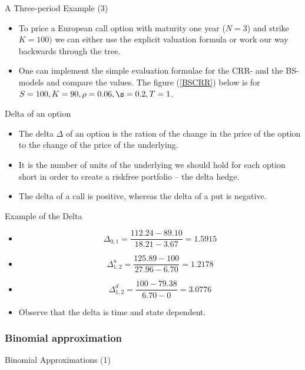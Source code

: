 { A Three-period Example (3)}
\begin{itemize}
\item To price a European call option with maturity one year ($N=3$) and
strike $K=100)$ we can either use the explicit valuation formula or work our way backwards through the tree.
\item One can implement the simple evaluation formulae for the CRR- and
the BS-models and compare the values. The figure (\ref{BSCRR}) below is for
$S=100, K=90, \rho=0.06, \s=0.2, T=1$.
\end{itemize}

{Delta  of an option}
\begin{itemize}
\item<1-> The delta $\Delta$ of an option is the ration of the change in the price of the option to the
change of the price of the underlying.
\item<2-> It is the number of units of the underlying we should hold for each option short in order to
create a riskfree portfolio -- the delta hedge.
\item<3-> The delta of a call is positive, whereas the delta of a put is negative.

\end{itemize}

{Example of the Delta}
\begin{itemize}
\item<1->
$$
\Delta_{0,1}=\frac{112.24-89.10}{18.21-3.67}=1.5915
$$
\item<2->
$$
\Delta^u_{1,2}=\frac{125.89-100}{27.96-6.70}=1.2178
$$
\item<3->
$$
\Delta^d_{1,2}=\frac{100-79.38}{6.70-0}=3.0776
$$
\item<4-> Observe that the delta is time and state dependent.
\end{itemize}

\subsubsection{Binomial approximation}

{Binomial Approximations (1)}

